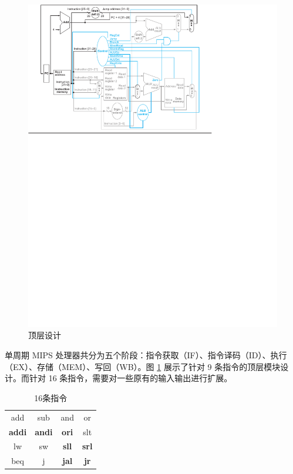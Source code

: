 \documentclass[a4paper,UTF8]{ctexart}
\begin{document}
\begin{figure}[H]
    \centering
    \includegraphics[width=\textwidth]{struct.pdf}
    \caption{顶层设计}
    \label{fig:top}
\end{figure}

单周期 MIPS 处理器共分为五个阶段：指令获取（IF）、指令译码（ID）、执行（EX）、存储（MEM）、写回（WB）。图 \ref{fig:top} 展示了针对 9 条指令的顶层模块设计。而针对 16 条指令，需要对一些原有的输入输出进行扩展。

\begin{table}[H]
    \centering
    \caption{16条指令}
    \begin{tabular}{>{\sffamily}c>{\sffamily}c>{\sffamily}c>{\sffamily}c}
        \hline
        add & sub & and & or \\
        \bfseries addi & \bfseries andi & \bfseries ori & slt \\
        lw & sw & \bfseries sll & \bfseries srl \\
        beq & j &\bfseries jal &\bfseries jr \\ 
        \hline
    \end{tabular}
\end{table}
\end{document}
